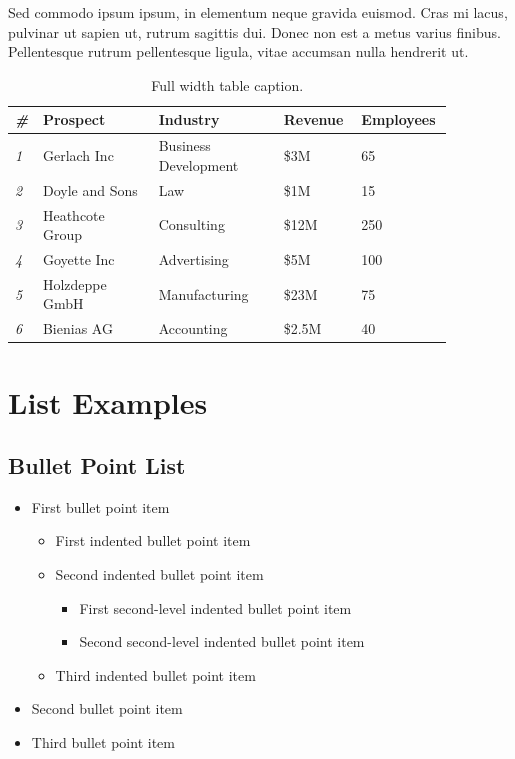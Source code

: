 \documentclass[
	a4paper, %
]{CSMakotoTechnicalReport}
\begin{document}
\begin{multicols}{2}
Sed commodo ipsum ipsum, in elementum neque gravida euismod. Cras mi lacus, pulvinar ut sapien ut, rutrum sagittis dui. Donec non est a metus varius finibus. Pellentesque rutrum pellentesque ligula, vitae accumsan nulla hendrerit ut.


\begin{table} %
	\caption{Full width table caption.}
	\begin{tabular}{C{0.03\linewidth} L{0.25\linewidth} L{0.27\linewidth} L{0.16\linewidth} L{0.16\linewidth}} %
		\toprule
		\textit{\#} & \textbf{Prospect} & \textbf{Industry} & \textbf{Revenue} & \textbf{Employees} \\
		\midrule
		\textit{1} & Gerlach Inc & Business Development & \$3M & 65\\
		\textit{2} & Doyle and Sons & Law & \$1M & 15\\
		\textit{3} & Heathcote Group & Consulting & \$12M & 250\\
		\textit{4} & Goyette Inc & Advertising & \$5M & 100\\
		\textit{5} & Holzdeppe GmbH & Manufacturing & \$23M & 75\\
		\textit{6} & Bienias AG & Accounting & \$2.5M & 40\\
		\bottomrule
	\end{tabular}
\end{table}


\section{List Examples}

\subsection{Bullet Point List}

\begin{itemize}
	\item First bullet point item
	\begin{itemize}
		\item First indented bullet point item
		\item Second indented bullet point item
		\begin{itemize}
			\item First second-level indented bullet point item
			\item Second second-level indented bullet point item
		\end{itemize}
		\item Third indented bullet point item
	\end{itemize}
	\item Second bullet point item
	\item Third bullet point item
\end{itemize}


\end{multicols}
\end{document}
